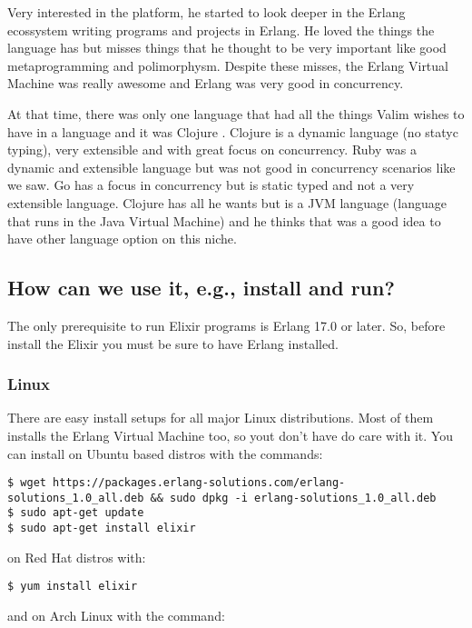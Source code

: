Very interested in the platform, he started to look deeper in the Erlang
ecossystem writing programs and projects in Erlang. He loved the things the
language has but misses things that he thought to be very important like good
metaprogramming and polimorphysm. Despite these misses, the Erlang Virtual
Machine was really awesome and Erlang was very good in concurrency.

At that time, there was only one language that had all the things Valim wishes
to have in a language and it was Clojure \cite{5_13}.
Clojure is a dynamic language (no statyc typing), very extensible and with great
focus on concurrency. Ruby was a dynamic and extensible language but was not
good in concurrency scenarios like we saw. Go \cite{5_14}
has a focus in concurrency but is static typed and not a very extensible
language. Clojure has all he wants but is a JVM language (language that runs in
the Java Virtual Machine) and he thinks that was a good idea to have other
language option on this niche.

\subsection{How can we use it, e.g., install and run?}

The only prerequisite to run Elixir programs is Erlang 17.0 or later. So, before
install the Elixir you must be sure to have Erlang installed.

\subsubsection{Linux}

There are easy install setups for all major Linux distributions. Most of them
installs the Erlang Virtual Machine too, so yout don't have do care with it. You
can install on Ubuntu based distros with the commands:

\begin{verbatim}
$ wget https://packages.erlang-solutions.com/erlang-solutions_1.0_all.deb && sudo dpkg -i erlang-solutions_1.0_all.deb
$ sudo apt-get update
$ sudo apt-get install elixir
\end{verbatim}

on Red Hat distros with:

\begin{verbatim}
$ yum install elixir
\end{verbatim}

and on Arch Linux with the command:

